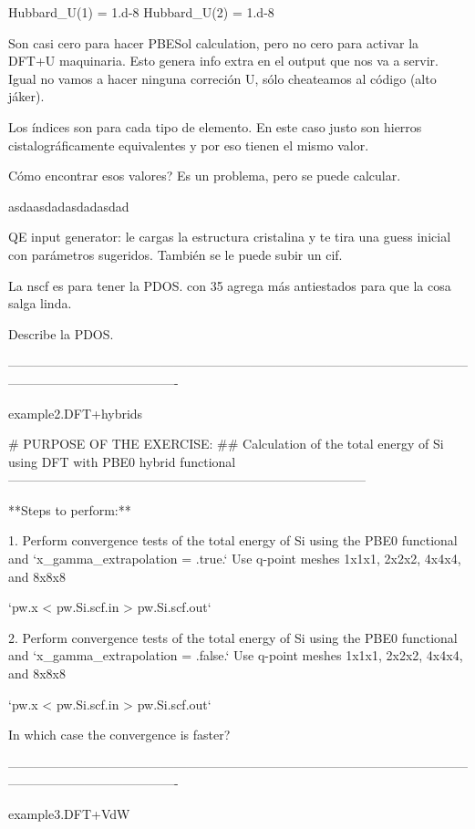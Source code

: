   Hubbard_U(1) = 1.d-8
  Hubbard_U(2) = 1.d-8

  Son casi cero para hacer PBESol calculation, pero no cero para activar la DFT+U maquinaria. Esto genera info extra en el output que nos va a servir. Igual no vamos a hacer ninguna correción U, sólo cheateamos al código (alto jáker).

  Los índices son para cada tipo de elemento. En este caso justo son hierros cistalográficamente equivalentes y por eso tienen el mismo valor.

  Cómo encontrar esos valores? Es un problema, pero se puede calcular.

  asdaasdadasdadasdad

  QE input generator:
  le cargas la estructura cristalina y te tira una guess inicial con parámetros sugeridos. También se le puede subir un cif.

  La nscf es para tener la PDOS. con 35 agrega más antiestados para que la cosa salga linda.

  Describe la PDOS.

----------------------------------------------------------------------------------------------------------------------------------------------------

example2.DFT+hybrids


# PURPOSE OF THE EXERCISE:
## Calculation of the total energy of Si using DFT with PBE0 hybrid functional
------------------------------------------------------------------------------------

**Steps to perform:**

1. Perform convergence tests of the total energy of Si using the
   PBE0 functional and `x_gamma_extrapolation = .true.`
   Use q-point meshes 1x1x1, 2x2x2, 4x4x4, and 8x8x8

   `pw.x < pw.Si.scf.in > pw.Si.scf.out`

2. Perform convergence tests of the total energy of Si using the
   PBE0 functional and `x_gamma_extrapolation = .false.`
   Use q-point meshes 1x1x1, 2x2x2, 4x4x4, and 8x8x8

   `pw.x < pw.Si.scf.in > pw.Si.scf.out`

   In which case the convergence is faster?



----------------------------------------------------------------------------------------------------------------------------------------------------

example3.DFT+VdW


